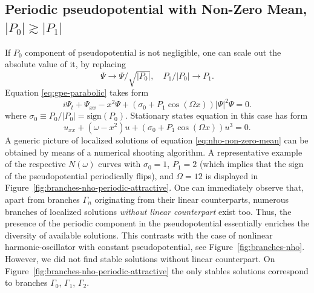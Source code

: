 \subsection{Periodic pseudopotential with Non-Zero Mean, $|P_0| \gtrsim |P_1|$}

If $P_0$ component of pseudopotential is not negligible, one can scale out the absolute value of it, by replacing 
\begin{equation}
	\Psi \to \Psi / \sqrt{|P_0|}, \quad P_1 / |P_0| \to P_1.
\end{equation}
Equation \eqref{eq:gpe-parabolic} takes form
\begin{equation}
	i \Psi_t + \Psi_{xx} - x^2 \Psi + (\sigma_0 + P_1 \cos (\Omega x)) |\Psi|^2 \Psi = 0.
\label{eq:gpe-non-zero-mean}
\end{equation}
where $\sigma_0 \equiv P_0 / |P_0| = \mathrm{sign} (P_0)$.
Stationary states equation in this case has form
\begin{equation}
	u_{xx} + (\omega - x^2) u + (\sigma_0 + P_1 \cos (\Omega x)) u^3 = 0.
\label{eq:nho-non-zero-mean}
\end{equation}
A generic picture of localized solutions of equation \eqref{eq:nho-non-zero-mean} can be obtained by means of a numerical shooting algorithm.
A representative example of the respective $N(\omega)$ curves with $\sigma_0 = 1$, $P_1 = 2$ (which implies that the sign of the pseudopotential periodically flips), and $\Omega = 12$ is displayed in Figure~\ref{fig:branches-nho-periodic-attractive}.
One can immediately observe that, apart from branches $\Gamma_n$ originating from their linear counterparts, numerous branches of localized solutions {\it without linear counterpart} exist too.
Thus, the presence of the periodic component in the pseudopotential essentially enriches the diversity of available solutions.
This contrasts with the case of nonlinear harmonic-oscillator with constant pseudopotential, see Figure~\ref{fig:branches-nho}.
However, we did not find stable solutions without linear counterpart.
On Figure~\ref{fig:branches-nho-periodic-attractive} the only stables solutions correspond to branches $\Gamma_0$, $\Gamma_1$, $\Gamma_2$.

